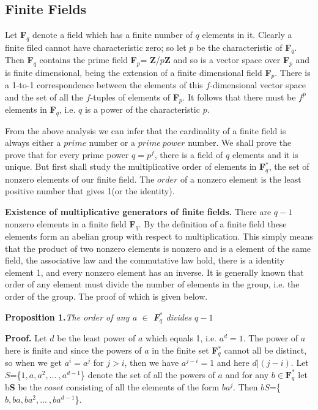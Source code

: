 \documentclass[12pt]{article}
\begin{document}
                    \subsection{Finite Fields}
Let \textbf{F}$_q$ denote a field which has a finite number of $q$
elements in it. Clearly a finite filed cannot have characteristic
zero; so let $p$ be the characteristic of \textbf{F}$_q$. Then
\textbf{F}$_q$ contains the prime field \textbf{F}$_p$=
\textbf{Z}/$p$\textbf{Z} and so is a vector space over
\textbf{F}$_p$ and is finite dimensional, being the extension of a
finite dimensional field \textbf{F}$_p$. There is a 1-to-1
correspondence between the elements of this $f$-dimensional vector
space and the set of all the $f$-tuples of elements of
\textbf{F}$_p$. It follows that there must be $f^p$ elements in
\textbf{F}$_q$, i.e. $q$ is a power of the characteristic $p$.

From the above analysis we can infer that the cardinality of a finite field is always either a $prime$ number or a $prime \: power$ number. We shall prove the prove that for every prime power $q=p^f$, there is a field of $q$ elements and it is unique. But first shall study the multiplicative order of elements in \textbf{F}$^*_q$, the set of nonzero elements of our finite field. The $order$ of a nonzero element is the least positive number that gives 1(or the identity).

\textbf{Existence of multiplicative generators of finite fields.} There are $q-1$ nonzero elements in a finite field \textbf{F}$_q$. By the definition of a finite field these elements form an abelian group with respect to multiplication. This simply means that the product of two nonzero elements is nonzero and is a element of the same field, the associative law and the commutative law hold, there is a identity element 1, and every nonzero element has an inverse. It is generally known that order of any element must divide the number of elements in the group, i.e. the order of the group. The proof of which is given below.

\textbf{Proposition 1.}\textit{The order of any a $\in$ \textbf{F}$^*_q$ divides $q-1$}

\textbf{Proof.} Let $d$ be the least power of $a$ which equals 1, i.e. $a^d=1$. The power of $a$ here is finite and since the powers of $a$ in the finite set \textbf{F}$^*_q$ cannot all be distinct, so when we get $a^i=a^j$ for $j>i$, then we have $
a^{j-i}=1$ and here $d|(j-i)$. Let $S$=\{$1,a,a^2, ... \:,a^{d-1}$\} denote the set of all the powers of $a$ and for any $b \in \textbf{F}^*_q$ let b\textbf{S} be the $coset$ consisting of all the elements of the form $ba^j$. Then $bS$=\{$b,ba,ba^2, ... \:,ba^{d-1}$\}.
\end{document}
